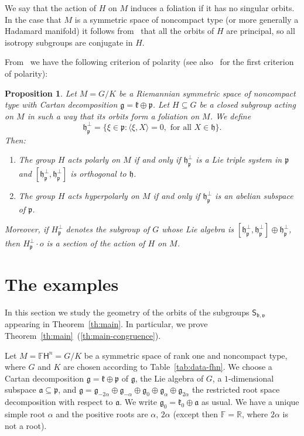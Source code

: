 \documentclass[12pt, a4paper]{amsart}
\newcommand{\g}{\mathfrak}
\newcommand{\s}{\mathsf}
\newcommand{\R}{\mathbb{R}}
\newcommand{\F}{\mathbb{F}}
\newtheorem{proposition}[theorem]{Proposition}
\theoremstyle{definition}
\begin{document}
We say that the action of $H$ on $M$ induces a foliation if it has no singular orbits.
In the case that $M$ is a symmetric space of noncompact type
(or more generally a Hadamard manifold)
it follows from~\cite[Proposition~2.1]{BerndtDiazTamaru10} that all the orbits of $H$ are principal,
so all isotropy subgroups are conjugate in $H$.

From~\cite[Theorem~4.1]{BerndtDiazTamaru10} we have the following criterion of polarity (see also~\cite{Gorodski04} for the first criterion of polarity):

\begin{proposition}\label{th:criterion}
	Let $M=G/K$ be a Riemannian symmetric space of noncompact type with Cartan decomposition $\g{g}=\g{k}\oplus\g{p}$.
	Let $H\subseteq G$ be a closed subgroup acting on $M$ in such a way that its orbits form a foliation on $M$.
	We define
	\[
	\g{h}_\g{p}^\perp=\big\{\xi\in\g{p}:\langle\xi,X\rangle=0,\text{ for all $X\in\g{h}$}\big\}.
	\]
	Then:
	\begin{enumerate}[\rm (i)]
		\item The group $H$ acts polarly on $M$ if and only if $\g{h}_\g{p}^\perp$ is a Lie triple system in $\g{p}$ and $[\g{h}_\g{p}^\perp,\g{h}_\g{p}^\perp]$ is orthogonal to $\g{h}$.
		\item The group $H$ acts hyperpolarly on $M$ if and only if $\g{h}_\g{p}^\perp$ is an abelian subspace of $\g{p}$.
	\end{enumerate}
	Moreover, if $H_\g{p}^\perp$ denotes the subgroup of $G$ whose Lie algebra is $[\g{h}_\g{p}^\perp,\g{h}_\g{p}^\perp]\oplus\g{h}_{\g{p}}^{\perp}$, then $H_\g{p}^\perp\cdot o$ is a section of the action of $H$ on $M$.
\end{proposition}

\section{The examples}\label{sec:examples}

In this section we study the geometry of the orbits of the subgroups $\s{S}_{\g{b},\g{v}}$
appearing in Theorem~\ref{th:main}.
In particular, we prove Theorem~\ref{th:main}~(\ref{th:main-congruence}).

Let $M=\mathbb{F}\s{H}^n=G/K$ be a symmetric space of rank one and noncompact type, 
where $G$ and $K$ are chosen according to Table~\ref{tab:data-fhn}.
We choose a Cartan decomposition $\g{g}=\g{k}\oplus\g{p}$ of $\g{g}$, the Lie algebra of $G$, 
a $1$-dimensional subspace $\g{a}\subseteq\g{p}$, and 
$\g{g}=\g{g}_{-2\alpha}\oplus\g{g}_{-\alpha}\oplus\g{g}_0
\oplus\g{g}_{\alpha}\oplus\g{g}_{2\alpha}$
the restricted root space decomposition with respect to $\g{a}$.
We write $\g{g}_0=\g{k}_0\oplus\g{a}$ as usual.
We have a unique simple root $\alpha$ and the positive roots are $\alpha,\,2\alpha$ (except then $\F=\R$, where $2\alpha$ is not a root).
\end{document}
